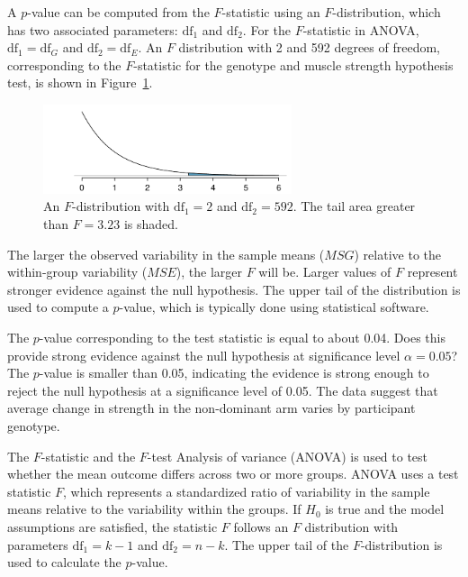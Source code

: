 \textD{\newpage}

A $p$-value can be computed from the $F$-statistic using an $F$-distribution, which has two associated parameters: $\textrm{df}_{1}$ and $\textrm{df}_{2}$. For the $F$-statistic in ANOVA, $\textrm{df}_{1} = \textrm{df}_{G}$ and $\textrm{df}_{2}= \textrm{df}_{E}$. An $F$ distribution with 2 and 592 degrees of freedom, corresponding to the $F$-statistic for the genotype and muscle strength hypothesis test, is shown in Figure~\ref{fDist2And592Shaded}.

\begin{figure}[ht]
	\centering
\includegraphics[width=0.65\textwidth]{ch_inference_for_means_oi_biostat/figures/fDist2And592/fDist2And592Shaded}
	\caption{An $F$-distribution with $\textrm{df}_1=2$ and $\textrm{df}_2=592$. The tail area greater than $F = 3.23$ is shaded.}
	\label{fDist2And592Shaded}
\end{figure}

The larger the observed variability in the sample means ($MSG$) relative to the within-group variability ($MSE$), the larger $F$ will be. Larger values of $F$ represent stronger evidence against the null hypothesis. The upper tail of the distribution is used to compute a $p$-value, which is typically done using statistical software.

\begin{examplewrap}
\begin{nexample}{The $p$-value corresponding to the test statistic is equal to about 0.04. Does this provide strong evidence against the null hypothesis at significance level $\alpha = 0.05$?}
The $p$-value is smaller than 0.05, indicating the evidence is strong enough to reject the null hypothesis at a significance level of 0.05. The data suggest that average change in strength in the non-dominant arm varies by participant genotype.	
\end{nexample}
\end{examplewrap}

\begin{onebox}{The $F$-statistic and the $F$-test}
		Analysis of variance (ANOVA) is used to test whether the mean outcome differs across two or more groups. ANOVA uses a test statistic $F$, which represents a standardized ratio of variability in the sample means relative to the variability within the groups. If $H_0$ is true and the model assumptions are satisfied, the statistic $F$ follows an $F$ distribution with parameters $\textrm{df}_{1}=k-1$ and $\textrm{df}_{2}=n-k$. The upper tail of the $F$-distribution is used to calculate the $p$-value.
\end{onebox}


